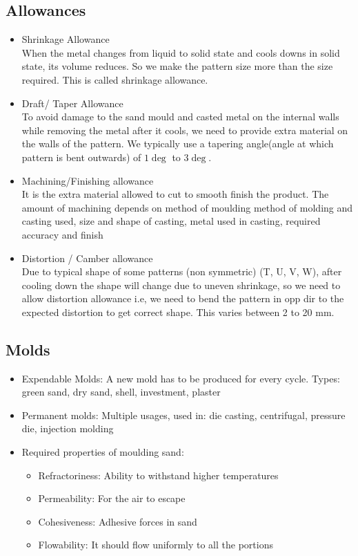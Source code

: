 \documentclass{article}
\begin{document}
	\subsection{Allowances}
	\begin{itemize}
		\item Shrinkage Allowance\\
			When the metal changes from liquid to solid state and cools downs in solid state, its volume reduces. So we make the pattern size more than the size required. This is called shrinkage allowance. 

		\item Draft/ Taper Allowance\\
			To avoid damage to the sand mould and casted metal on the internal walls while removing the metal after it cools, we need to provide extra material on the walls of the pattern. We typically use a tapering angle(angle at which pattern is bent outwards) of $1\deg$ to $3\deg$.

		\item Machining/Finishing allowance\\
			It is the extra material allowed to cut to smooth finish the product. The amount of machining depends on method of moulding method of molding and casting used, size and shape of casting, metal used in casting, required accuracy and finish

		\item Distortion / Camber allowance\\
		 	Due to typical shape of some patterns (non symmetric) (T, U, V, W), after cooling down the shape will change due to uneven shrinkage, so we need to allow distortion allowance i.e, we need to bend the pattern in opp dir to the expected distortion to get correct shape. This varies between 2 to 20 mm.
	\end{itemize}

	\subsection{Molds}
	\begin{itemize}
		\item Expendable Molds: A new mold has to be produced for every cycle. Types: green sand, dry sand, shell, investment, plaster
		\item Permanent molds: Multiple usages, used in: die casting, centrifugal, pressure die, injection molding

		\item Required properties of moulding sand:
		\begin{itemize}
			\item Refractoriness: Ability to withstand higher temperatures
			\item Permeability: For the air to escape
			\item Cohesiveness: Adhesive forces in sand
			\item Flowability: It should flow uniformly to all the portions
		\end{itemize}
	\end{itemize}
\end{document}
